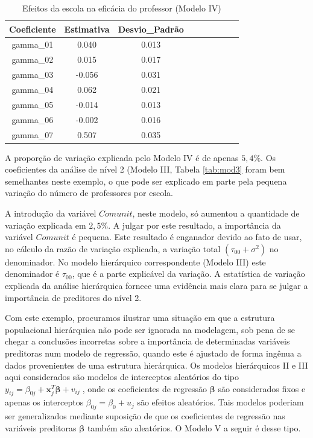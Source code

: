 \documentclass[]{book}
\theoremstyle{definition}
\theoremstyle{definition}
\theoremstyle{definition}
\theoremstyle{remark}
\begin{document}
\begin{table}

\caption{\label{tab:mod4}Efeitos da escola na eficácia do professor (Modelo IV)}
\centering
\begin{tabular}[t]{ccccccccc}
\toprule
Coeficiente & Estimativa & Desvio\_Padrão\\
\midrule
gamma\_01 & 0.040 & 0.013\\
gamma\_02 & 0.015 & 0.017\\
gamma\_03 & -0.056 & 0.031\\
gamma\_04 & 0.062 & 0.021\\
gamma\_05 & -0.014 & 0.013\\
\addlinespace
gamma\_06 & -0.002 & 0.016\\
gamma\_07 & 0.507 & 0.035\\
\bottomrule
\end{tabular}
\end{table}

A proporção de variação explicada pelo Modelo IV é de apenas \(5,4\%\).
Os coeficientes da análise de nível 2 (Modelo III, Tabela \ref{tab:mod3}
foram bem semelhantes neste exemplo, o que pode ser explicado em parte
pela pequena variação do número de professores por escola.

A introdução da variável \(Comunit\), neste modelo, só aumentou a
quantidade de variação explicada em \(2,5\%\). A julgar por este
resultado, a importância da variável \(Comunit\) é pequena. Este
resultado é enganador devido ao fato de usar, no cálculo da razão de
variação explicada, a variação total
\(\left( \tau _{00}+\sigma ^{2}\right)\) no denominador. No modelo
hierárquico correspondente (Modelo III) este denominador é
\(\tau_{00}\), que é a parte explicável da variação. A estatística de
variação explicada da análise hierárquica fornece uma evidência mais
clara para se julgar a importância de preditores do nível 2.

Com este exemplo, procuramos ilustrar uma situação em que a estrutura
populacional hierárquica não pode ser ignorada na modelagem, sob pena de
se chegar a conclusões incorretas sobre a importância de determinadas
variáveis preditoras num modelo de regressão, quando este é ajustado de
forma ingênua a dados provenientes de uma estrutura hierárquica. Os
modelos hierárquicos II e III aqui considerados são modelos de
interceptos aleatórios do tipo
\(y_{ij}=\beta _{0j}+\mathbf{x}_{j}^{T}\mathbf{\beta +}v_{ij}\;\), onde
os coeficientes de regressão \(\mathbf{\beta }\) são considerados fixos
e apenas os interceptos \(\beta _{0j}=\beta _{0}+u_{j}\) são efeitos
aleatórios. Tais modelos poderiam ser generalizados mediante suposição
de que os coeficientes de regressão nas variáveis preditoras
\(\mathbf{\beta}\) também são aleatórios. O Modelo V a seguir é desse
tipo.
\end{document}
